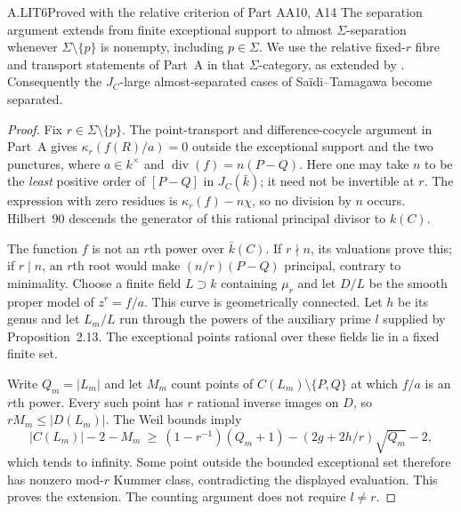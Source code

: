 \begin{claim}{A.LIT6}{Proved with the relative criterion of Part A}{A10, A14}
The separation argument extends from finite exceptional support to
almost $\Sigma$-separation whenever $\Sigma\setminus\{p\}$ is nonempty,
including $p\in\Sigma$. We use the relative fixed-$r$ fibre and
transport statements of Part~A in that $\Sigma$-category, as extended
by . Consequently the $J_C$-large
almost-separated cases of Sa\"idi--Tamagawa become separated.
\end{claim}
\begin{proof}
Fix $r\in\Sigma\setminus\{p\}$. The point-transport and difference-cocycle argument
in Part~A gives
$\kappa_r(f(R)/a)=0$ outside the exceptional support and the two
punctures, where $a\in k^\times$ and
$\operatorname{div}(f)=n(P-Q)$. Here one may take $n$ to be the
\emph{least} positive order of $[P-Q]$ in $J_C(\bar k)$; it need not
be invertible at $r$. The expression with zero residues is
$\kappa_r(f)-n\chi$, so no division by $n$ occurs. Hilbert~90 descends
the generator of this rational principal divisor to $k(C)$.

The function $f$ is not an $r$th power over $\bar k(C)$. If $r\nmid n$,
its valuations prove this; if $r\mid n$, an $r$th root would make
$(n/r)(P-Q)$ principal, contrary to minimality. Choose a finite field
$L\supset k$ containing $\mu_r$ and let $D/L$ be the smooth proper
model of $z^r=f/a$. This curve is geometrically connected. Let $h$ be
its genus and let $L_m/L$ run through the powers of the auxiliary
prime $l$ supplied by Proposition~2.13. The exceptional points rational
over these fields lie in a fixed finite set.

Write $Q_m=|L_m|$ and let $M_m$ count points of
$C(L_m)\setminus\{P,Q\}$ at which $f/a$ is an $r$th power.
Every such point has $r$ rational inverse images on $D$, so
$rM_m\leq|D(L_m)|$. The Weil bounds imply
\[
 |C(L_m)|-2-M_m\ \geq\
 (1-r^{-1})(Q_m+1)-(2g+2h/r)\sqrt{Q_m}-2,
\]
which tends to infinity. Some point outside the bounded exceptional
set therefore has nonzero mod-$r$ Kummer class, contradicting the
displayed evaluation. This proves the extension. The counting argument
does not require $l\ne r$.
\end{proof}

